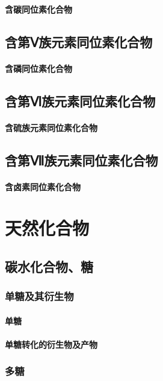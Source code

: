 \documentclass[UTF8]{../03-Chemistry}
\begin{document}
    \subsubsection{含碳同位素化合物}
\section{含第Ⅴ族元素同位素化合物}
    \subsubsection{含磷同位素化合物}
\section{含第Ⅵ族元素同位素化合物}
    \subsubsection{含硫族元素同位素化合物}
\section{含第Ⅶ族元素同位素化合物}
    \subsubsection{含卤素同位素化合物}








\chapter{天然化合物}
\section{碳水化合物、糖}
    \subsection{单糖及其衍生物}
        \subsubsection{单糖}
        \subsubsection{单糖转化的衍生物及产物}
    \subsection{多糖}
\end{document}
